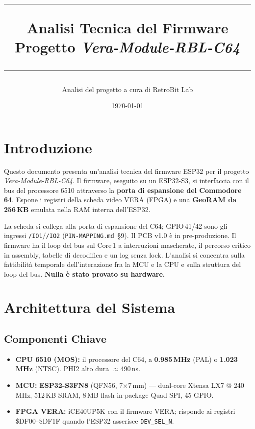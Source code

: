 \documentclass[12pt, a4paper]{article}
\title{
    \vspace{2cm}
    \hrule
    \vspace{0.5cm}
    {\Huge \bfseries Analisi Tecnica del Firmware}\\
    \vspace{0.2cm}
    {\Large Progetto \textit{Vera-Module-RBL-C64}}\\
    \vspace{0.5cm}
    \hrule
}
\author{Analisi del progetto a cura di RetroBit Lab}
\date{\today}
\begin{document}
\maketitle
\thispagestyle{empty}

\newpage
\tableofcontents
\thispagestyle{empty}

\newpage
\setcounter{page}{1}


\section{Introduzione}
Questo documento presenta un'analisi tecnica del firmware ESP32 per il progetto \textit{Vera-Module-RBL-C64}. Il firmware, eseguito su un ESP32-S3, si interfaccia con il bus del processore 6510 attraverso la \textbf{porta di espansione del Commodore 64}. Espone i registri della scheda video VERA (FPGA) e una \textbf{GeoRAM da 256\,KB} emulata nella RAM interna dell'ESP32.

La scheda si collega alla porta di espansione del C64; GPIO\,41/42 sono gli ingressi \texttt{/IO1}/\texttt{/IO2} (\texttt{PIN-MAPPING.md}~\S9). Il PCB v1.0 è in pre-produzione. Il firmware ha il loop del bus sul Core\,1 a interruzioni mascherate, il percorso critico in assembly, tabelle di decodifica e un log senza lock. L'analisi si concentra sulla fattibilità temporale dell'interazione fra la MCU e la CPU e sulla struttura del loop del bus. \textbf{Nulla è stato provato su hardware.}

\section{Architettura del Sistema}

\subsection{Componenti Chiave}
\begin{itemize}
    \item {\bfseries CPU 6510 (MOS):} il processore del C64, a \textbf{0.985\,MHz} (PAL) o \textbf{1.023\,MHz} (NTSC). PHI2 alto dura $\approx$490\,ns.
    \item {\bfseries MCU:} \textbf{ESP32-S3FN8} (QFN56, 7$\times$7\,mm) --- dual-core Xtensa LX7 @ 240\,MHz, 512\,KB SRAM, 8\,MB flash in-package Quad SPI, 45 GPIO.
    \item {\bfseries FPGA VERA:} iCE40UP5K con il firmware VERA; risponde ai registri \$DF00--\$DF1F quando l'ESP32 asserisce \texttt{DEV\_SEL\_N}.
\end{itemize}
\end{document}
